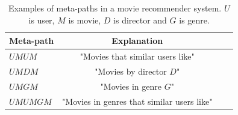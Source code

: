 \begin{table}[h]
\centering
\caption{Examples of meta-paths in a movie recommender system. $U$ is user, $M$ is movie, $D$ is director and $G$ is genre.}
\label{tab:movie_meta-paths}
\begin{tabular}{lccc}
\toprule
Meta-path & Explanation \\
\midrule
$UMUM$        & "Movies that similar users like" \\
$UMDM$        & "Movies by director $D$" \\
$UMGM$        & "Movies in genre $G$" \\
$UMUMGM$      & "Movies in genres that similar users like" \\
\bottomrule
\end{tabular}
\end{table}